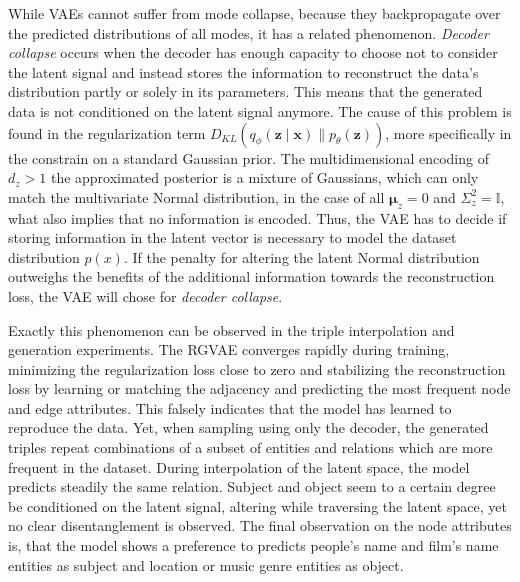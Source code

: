While VAEs cannot suffer from mode collapse, because they backpropagate over the predicted distributions of all modes, it has a related phenomenon. \textit{Decoder collapse} occurs when the decoder has enough capacity to choose not to consider the latent signal and instead stores the information to reconstruct the data's distribution partly or solely in its parameters. This means that the generated data is not conditioned on the latent signal anymore. The cause of this problem is found in the regularization term $D_{K L}\left(q_{{\phi}}\left(\mathbf{z} \mid \mathbf{x}\right) \| p_{{\theta}}(\mathbf{z})\right)$, more specifically in the constrain on a standard Gaussian prior. The multidimensional encoding of $d_z>1$ the approximated posterior is a mixture of Gaussians, which can only match the multivariate Normal distribution, in the case of all $\mathbf{\mu}_z=0$ and $\Sigma^2_z=\mathbb{I}$, what also implies that no information is encoded. Thus, the VAE has to decide if storing information in the latent vector is necessary to model the dataset distribution $p(x)$. If the penalty for altering the latent Normal distribution outweighs the benefits of the additional information towards the reconstruction loss, the VAE will chose for \textit{decoder collapse}. 




Exactly this phenomenon can be observed in the triple interpolation and generation experiments. The RGVAE converges rapidly during training, minimizing the regularization loss close to zero and stabilizing the reconstruction loss by learning or matching the adjacency and predicting the most frequent node and edge attributes. This falsely indicates that the model has learned to reproduce the data. Yet, when sampling using only the decoder, the generated triples repeat combinations of a subset of entities and relations which are more frequent in the dataset. During interpolation of the latent space, the model predicts steadily the same relation. Subject and object seem to a certain degree be conditioned on the latent signal, altering while traversing the latent space, yet no clear disentanglement is observed. The final observation on the node attributes is, that the model shows a preference to predicts people's name and film's name entities as subject and location or music genre entities as object.

